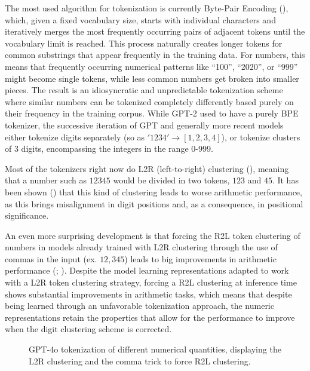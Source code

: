 \documentclass[
  a4paper, twoside, 10pt, titlepage]{book}
\makeatletter
\newcommand*\pandocbounded[1]{%
  \sbox\pandoc@box{#1}%
  \Gscale@div\@tempa{\textheight}{\dimexpr\ht\pandoc@box+\dp\pandoc@box\relax}%
  \Gscale@div\@tempb{\linewidth}{\wd\pandoc@box}%
  \ifdim\@tempb\p@<\@tempa\p@\let\@tempa\@tempb\fi%
  \ifdim\@tempa\p@<\p@\scalebox{\@tempa}{\usebox\pandoc@box}%
  \else\usebox{\pandoc@box}%
  \fi%
}
\makeatother
\begin{document}
The most used algorithm for tokenization is currently Byte-Pair Encoding
(), which, given a fixed
vocabulary size, starts with individual characters and iteratively
merges the most frequently occurring pairs of adjacent tokens until the
vocabulary limit is reached. This process naturally creates longer
tokens for common substrings that appear frequently in the training
data. For numbers, this means that frequently occurring numerical
patterns like ``100'', ``2020'', or ``999'' might become single tokens,
while less common numbers get broken into smaller pieces. The result is
an idiosyncratic and unpredictable tokenization scheme where similar
numbers can be tokenized completely differently based purely on their
frequency in the training corpus. While GPT-2 used to have a purely BPE
tokenizer, the successive iteration of GPT and generally more recent
models either tokenize digits separately (so as
\('1234' \rightarrow [1, 2, 3, 4]\)), or tokenize clusters of 3 digits,
encompassing the integers in the range 0-999.

Most of the tokenizers right now do L2R (left-to-right) clustering
(), meaning that a number
such as \(12345\) would be divided in two tokens, \(123\) and \(45\). It
has been shown () that
this kind of clustering leads to worse arithmetic performance, as this
brings misalignment in digit positions and, as a consequence, in
positional significance.

An even more surprising development is that forcing the R2L token
clustering of numbers in models already trained with L2R clustering
through the use of commas in the input (ex. \(12,345\)) leads to big
improvements in arithmetic performance
(;
). Despite the model
learning representations adapted to work with a L2R token clustering
strategy, forcing a R2L clustering at inference time shows substantial
improvements in arithmetic tasks, which means that despite being learned
through an unfavorable tokenization approach, the numeric
representations retain the properties that allow for the performance to
improve when the digit clustering scheme is corrected.

\begin{figure}
\centering
\pandocbounded{\texttt{[image: res/gpt4o-tokenization.png]}}
\caption{GPT-4o tokenization of different numerical quantities,
displaying the L2R clustering and the comma trick to force R2L
clustering.}
\end{figure}
\end{document}
